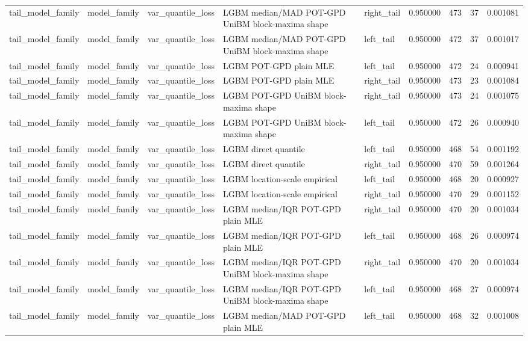 \begin{tabular}{lllllrrr}
tail\_model\_family & model\_family & var\_quantile\_loss & LGBM median/MAD POT-GPD UniBM block-maxima shape & right\_tail & 0.950000 & 473 & 37 & 0.001081 \\
tail\_model\_family & model\_family & var\_quantile\_loss & LGBM median/MAD POT-GPD UniBM block-maxima shape & left\_tail & 0.950000 & 472 & 37 & 0.001017 \\
tail\_model\_family & model\_family & var\_quantile\_loss & LGBM POT-GPD plain MLE & left\_tail & 0.950000 & 472 & 24 & 0.000941 \\
tail\_model\_family & model\_family & var\_quantile\_loss & LGBM POT-GPD plain MLE & right\_tail & 0.950000 & 473 & 23 & 0.001084 \\
tail\_model\_family & model\_family & var\_quantile\_loss & LGBM POT-GPD UniBM block-maxima shape & right\_tail & 0.950000 & 473 & 24 & 0.001075 \\
tail\_model\_family & model\_family & var\_quantile\_loss & LGBM POT-GPD UniBM block-maxima shape & left\_tail & 0.950000 & 472 & 26 & 0.000940 \\
tail\_model\_family & model\_family & var\_quantile\_loss & LGBM direct quantile & left\_tail & 0.950000 & 468 & 54 & 0.001192 \\
tail\_model\_family & model\_family & var\_quantile\_loss & LGBM direct quantile & right\_tail & 0.950000 & 470 & 59 & 0.001264 \\
tail\_model\_family & model\_family & var\_quantile\_loss & LGBM location-scale empirical & left\_tail & 0.950000 & 468 & 20 & 0.000927 \\
tail\_model\_family & model\_family & var\_quantile\_loss & LGBM location-scale empirical & right\_tail & 0.950000 & 470 & 29 & 0.001152 \\
tail\_model\_family & model\_family & var\_quantile\_loss & LGBM median/IQR POT-GPD plain MLE & right\_tail & 0.950000 & 470 & 20 & 0.001034 \\
tail\_model\_family & model\_family & var\_quantile\_loss & LGBM median/IQR POT-GPD plain MLE & left\_tail & 0.950000 & 468 & 26 & 0.000974 \\
tail\_model\_family & model\_family & var\_quantile\_loss & LGBM median/IQR POT-GPD UniBM block-maxima shape & right\_tail & 0.950000 & 470 & 20 & 0.001034 \\
tail\_model\_family & model\_family & var\_quantile\_loss & LGBM median/IQR POT-GPD UniBM block-maxima shape & left\_tail & 0.950000 & 468 & 27 & 0.000974 \\
tail\_model\_family & model\_family & var\_quantile\_loss & LGBM median/MAD POT-GPD plain MLE & left\_tail & 0.950000 & 468 & 32 & 0.001008 \\

\end{tabular}
